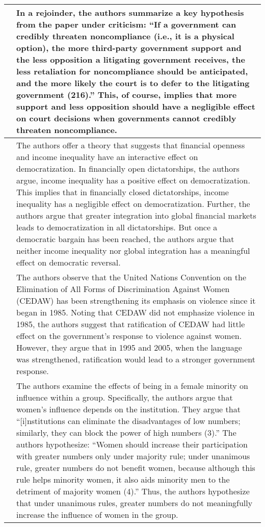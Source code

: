 \documentclass[12pt]{article}
\begin{document}
\begin{center}
\begin{longtable}{p{5cm} p{10cm}}
\hline
\cite{Carrubba2012c} & In a rejoinder, the authors summarize a key hypothesis from the paper under criticism: ``If a government can credibly threaten noncompliance (i.e., it is a physical option), the more third-party government support and the less opposition a litigating government receives, the less retaliation for noncompliance should be anticipated, and the more likely the court is to defer to the litigating government (216).'' This, of course, implies that more support and less opposition should have a negligible effect on court decisions when governments cannot credibly threaten noncompliance. \\ 
\hline
\cite{Freeman2012} & The authors offer a theory that suggests that financial openness and income inequality have an interactive effect on democratization. In financially open dictatorships, the authors argue, income inequality has a positive effect on democratization.  This implies that in financially closed dictatorships, income inequality has a negligible effect on democratization. Further, the authors argue that greater integration into global financial markets leads to democratization in all dictatorships. But once a democratic bargain has been reached, the authors argue that neither income inequality nor global integration has a meaningful effect on democratic reversal.\\
\hline
\cite{Htun2012} & The authors observe that the United Nations Convention on the Elimination of All Forms of Discrimination Against Women (CEDAW) has been strengthening its emphasis on violence since it began in 1985. Noting that CEDAW did not emphasize violence in 1985, the authors suggest that ratification of CEDAW had little effect on the government's response to violence against women. However, they argue that in 1995 and 2005, when the language was strengthened, ratification would lead to a stronger government response. \\ 
\hline
\cite{Karpowitz2012} & The authors examine the effects of being in a female minority on influence within a group. Specifically, the authors argue that women's influence depends on the institution. They argue that ``[i]nstitutions can eliminate the disadvantages of low numbers; similarly, they can block the power of high numbers (3).'' The authors hypothesize: ``Women should increase their participation with greater numbers only under majority rule; under unanimous rule, greater numbers do not benefit women, because although this rule helps minority women, it also aids minority men to the detriment of majority women (4).'' Thus, the authors hypothesize that under unanimous rules, greater numbers do not meaningfully increase the influence of women in the group.\\ 

\end{longtable}
\end{center}
\end{document}
